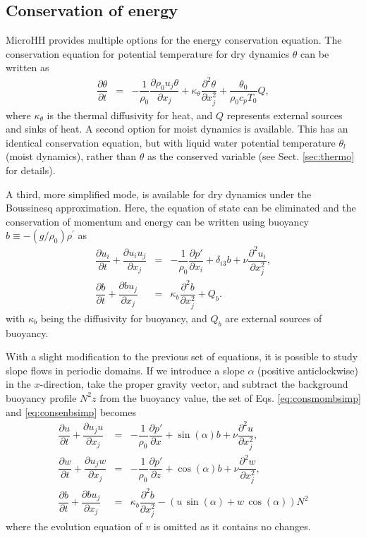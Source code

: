 \documentclass[gmd,manuscript]{copernicus}
\begin{document}
\subsection{Conservation of energy}\label{sec:dyncore_energy}
\label{sec:conservation_of_energy}
MicroHH provides multiple options for the energy conservation equation. The conservation equation for  potential temperature for dry dynamics $\theta$ can be written as
\begin{eqnarray}
\dfrac{\partial \theta}{\partial t} & = & - \dfrac{1}{\rho_0} \dfrac{\partial \rho_0 u_j \theta}{\partial x_j} + \kappa_\theta \dfrac{\partial^2 \theta}{\partial x_j^2} + \dfrac{\theta_0}{\rho_0 c_p T_0} Q,
\end{eqnarray}
where $\kappa_\theta$ is the thermal diffusivity for heat, and $Q$ represents external sources and sinks of heat. A second option for moist dynamics is available. This has an identical conservation equation, but with liquid water potential temperature $\theta_l$ (moist dynamics), rather than $\theta$ as the conserved variable (see Sect. \ref{sec:thermo} for details).

A third, more simplified mode, is available for dry dynamics under the Boussinesq approximation. Here, the equation of state can be eliminated and the conservation of momentum and energy can be written using buoyancy $b \equiv -(g/\rho_0)\rho^\prime$ as
\begin{eqnarray}
\dfrac{\partial u_i}{\partial t} + \dfrac{\partial u_i u_j}{\partial x_j} & = & 
- \dfrac{1}{\rho_0}\dfrac{\partial p'}{\partial x_i} + \delta_{i3} b + \nu \dfrac{\partial^2 u_i}{\partial x_j^2}\label{eq:consmombsimp},\\
\dfrac{\partial b}{\partial t} + \dfrac{\partial b u_j}{\partial x_j} & = & 
\kappa_b \dfrac{\partial^2 b}{\partial x_j^2} + Q_b \label{eq:consenbsimp}.
\end{eqnarray}
with $\kappa_b$ being the diffusivity for buoyancy, and $Q_b$ are external sources of buoyancy.

With a slight modification to the previous set of equations, it is possible to study slope flows in periodic domains. If we introduce a slope $\alpha$ (positive anticlockwise) in the $x$-direction, take the proper gravity vector, and subtract the background buoyancy profile $N^2 z$ from the buoyancy value, the set of Eqs. \ref{eq:consmombsimp} and \ref{eq:consenbsimp} becomes
\begin{eqnarray}
\dfrac{\partial u}{\partial t} + \dfrac{\partial u_j u}{\partial x_j} & = & 
- \dfrac{1}{\rho_0}\dfrac{\partial p'}{\partial x} + \sin(\alpha) b + \nu \dfrac{\partial^2 u}{\partial x_j^2}\label{eq:consuslope},\\
\dfrac{\partial w}{\partial t} + \dfrac{\partial u_j w}{\partial x_j} & = & 
- \dfrac{1}{\rho_0}\dfrac{\partial p'}{\partial z} + \cos(\alpha) b + \nu \dfrac{\partial^2 w}{\partial x_j^2}\label{eq:conswslope},\\
\dfrac{\partial b}{\partial t} + \dfrac{\partial b u_j}{\partial x_j} & = & 
\kappa_b \dfrac{\partial^2 b}{\partial x_j^2} - \left (u\,\sin(\alpha) + w\,\cos(\alpha) \right) N^2\label{eq:consbslope}
\end{eqnarray}
where the evolution equation of $v$ is omitted as it contains no changes.
\end{document}
